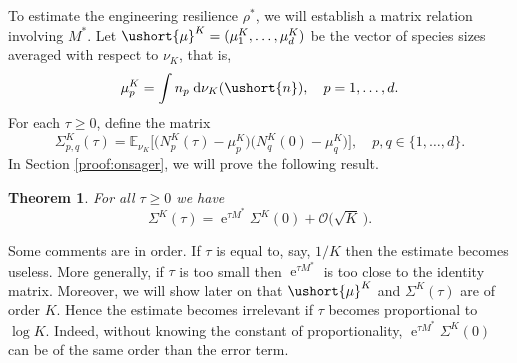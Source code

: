 \documentclass[10pt]{amsart}
\let\mathcal\mathscr
\numberwithin{equation}{section}
\theoremstyle{plain}
\newtheorem{theorem}{Theorem}[section]
\theoremstyle{definition}
\newcommand{\E}{{\mathbb{E}}}
\newcommand{\sK}{K}
\newcommand{\vecn}{\ushort{n}}
\newcommand{\vmu}{\ushort{\mu}}
\newcommand{\res}{\rho^*}
\newcommand{\nuk}{\nu_{K}}\let\snuk\nuk
\newcommand{\e}{\operatorname{e}}
\newcommand{\dd}{\hspace{1pt}\mathrm{d}}
\begin{document}
To estimate the engineering resilience $\res$, we will establish a matrix relation involving $M^*$.
Let $\vmu^{\sK}=(\mu_1^{\sK},\ldots,\mu_d^{\sK})$ be the vector of species sizes averaged with respect to $\nuk$, that is,
\begin{equation}
\label{def-mup}
\mu_{p}^{\sK}=\int n_{p}\,\dd\nuk(\vecn),\quad p=1,\ldots,d.
\end{equation}
For each $\tau\geq 0$, define the matrix
\[
\Sigma^{\sK}_{p,q}(\tau)=
\E_{\snuk}\bigl[\bigl(N_{p}^{\sK}(\tau)-\mu_{p}^{\sK}\bigr)\bigl(N_{q}^{\sK}(0)-\mu_{q}^{\sK}\bigr)\bigr],\quad p,q \in \{1, \ldots, d\}.
\]
In Section \ref{proof:onsager}, we will prove the following result.
\begin{theorem}
\label{thm-onsager-relation}
For all $\tau\geq 0$ we have
\begin{equation}\label{onsager}
\Sigma^{\sK}(\tau)=\e^{\tau M^*}\Sigma^{\sK}(0)+\mathcal{O}\bigl(\sqrt{K}\,\bigr).
\end{equation}
\end{theorem}
Some comments are in order. If $\tau$ is equal to, say, $1/K$ then the estimate becomes useless. More generally, if $\tau$ is too small then
$\e^{\tau M^*}$ is too close to the identity matrix.
Moreover, we will show later on that $\vmu^{\sK}$ and $\Sigma^{\sK}(\tau)$ are of order $K$. Hence the estimate becomes irrelevant
if $\tau$ becomes proportional to $\log K$. Indeed, without knowing the constant of proportionality, $\e^{\tau M^*}\Sigma^{\sK}(0)$ can be of the same
order than the error term.
\end{document}
